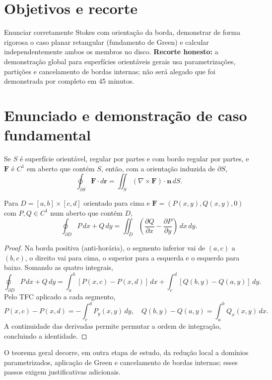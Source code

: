 \documentclass[11pt,a4paper]{article}
\begin{document}
\section{Objetivos e recorte}
Enunciar corretamente Stokes com orientação da borda, demonstrar de forma rigorosa o caso planar retangular (fundamento de Green) e calcular independentemente ambos os membros no disco. \textbf{Recorte honesto:} a demonstração global para superfícies orientáveis gerais usa parametrizações, partições e cancelamento de bordas internas; não será alegado que foi demonstrada por completo em 45 minutos.
\section{Enunciado e demonstração de caso fundamental}
\begin{teorema}
Se $S$ é superfície orientável, regular por partes e com bordo regular por partes, e $\mathbf F$ é $C^1$ em aberto que contém $S$, então, com a orientação induzida de $\partial S$,
\[
\oint_{\partial S}\mathbf F\cdot d\mathbf r
=\iint_S(\nabla\times\mathbf F)\cdot\mathbf n\,dS.
\]
\end{teorema}
\begin{proposicao}
Para $D=[a,b]\times[c,d]$ orientado para cima e $\mathbf F=(P(x,y),Q(x,y),0)$ com $P,Q\in C^1$ num aberto que contém $D$,
\[
\oint_{\partial D}P\,dx+Q\,dy
=\iint_D\left(\frac{\partial Q}{\partial x}-\frac{\partial P}{\partial y}\right)\,dx\,dy.
\]
\end{proposicao}
\begin{proof}
Na borda positiva (anti-horária), o segmento inferior vai de $(a,c)$ a $(b,c)$, o direito vai para cima, o superior para a esquerda e o esquerdo para baixo. Somando as quatro integrais,
\[
\oint_{\partial D}P\,dx+Q\,dy=
\int_a^b[P(x,c)-P(x,d)]\,dx
+\int_c^d[Q(b,y)-Q(a,y)]\,dy.
\]
Pelo TFC aplicado a cada segmento,
\[
P(x,c)-P(x,d)=-\int_c^d P_y(x,y)\,dy,\quad
Q(b,y)-Q(a,y)=\int_a^b Q_x(x,y)\,dx.
\]
A continuidade das derivadas permite permutar a ordem de integração, concluindo a identidade.
\end{proof}
\noindent O teorema geral decorre, em outra etapa de estudo, da redução local a domínios parametrizados, aplicação de Green e cancelamento de bordas internas; esses passos exigem justificativas adicionais.
\end{document}
